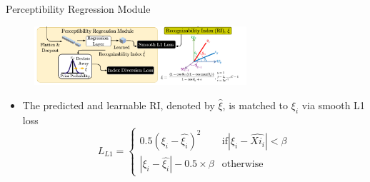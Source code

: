 \documentclass[aspectratio=169,xcolor=dvipsnames]{beamer}
\begin{document}
\begin{frame}{Perceptibility Regression Module}
    \begin{figure}
        \centering
        \includegraphics[width=0.7\textwidth]{imgs/12_Fig_3_3_PRM.png}
        \label{fig:f3-3-prm}
    \end{figure}
   \begin{itemize}
    \item The predicted and learnable RI, denoted by $\hat{\xi}$, is matched to $\xi_i$ via smooth L1 loss%
    $$L_{L1} = 
    \begin{cases}
        0.5 (\xi_i - \hat{\xi_i})^2 & \text{if} |\xi_i - \hat{Xi_i}| < \beta\\
        |\xi_i - \hat{\xi_i}| - 0.5 \times \beta & \text{otherwise}
    \end{cases}
    $$
   \end{itemize} 
\end{frame}
\end{document}
